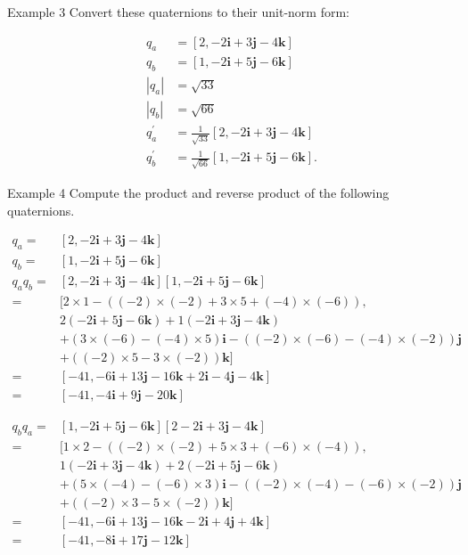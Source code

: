 Example 3 Convert these quaternions to their unit-norm form:

$$
\begin{aligned}
q_{a} & =[2,-2 \mathbf{i}+3 \mathbf{j}-4 \mathbf{k}] \\
q_{b} & =[1,-2 \mathbf{i}+5 \mathbf{j}-6 \mathbf{k}] \\
\left|q_{a}\right| & =\sqrt{33} \\
\left|q_{b}\right| & =\sqrt{66} \\
q_{a}^{\prime} & =\frac{1}{\sqrt{33}}[2,-2 \mathbf{i}+3 \mathbf{j}-4 \mathbf{k}] \\
q_{b}^{\prime} & =\frac{1}{\sqrt{66}}[1,-2 \mathbf{i}+5 \mathbf{j}-6 \mathbf{k}] .
\end{aligned}
$$

Example 4 Compute the product and reverse product of the following quaternions.

$$
\begin{aligned}
q_{a}= & {[2,-2 \mathbf{i}+3 \mathbf{j}-4 \mathbf{k}] } \\
q_{b}= & {[1,-2 \mathbf{i}+5 \mathbf{j}-6 \mathbf{k}] } \\
q_{a} q_{b}= & {[2,-2 \mathbf{i}+3 \mathbf{j}-4 \mathbf{k}][1,-2 \mathbf{i}+5 \mathbf{j}-6 \mathbf{k}] } \\
= & {[2 \times 1-((-2) \times(-2)+3 \times 5+(-4) \times(-6)),} \\
& 2(-2 \mathbf{i}+5 \mathbf{j}-6 \mathbf{k})+1(-2 \mathbf{i}+3 \mathbf{j}-4 \mathbf{k}) \\
& +(3 \times(-6)-(-4) \times 5) \mathbf{i}-((-2) \times(-6)-(-4) \times(-2)) \mathbf{j} \\
& +((-2) \times 5-3 \times(-2)) \mathbf{k}] \\
= & {[-41,-6 \mathbf{i}+13 \mathbf{j}-16 \mathbf{k}+2 \mathbf{i}-4 \mathbf{j}-4 \mathbf{k}] } \\
= & {[-41,-4 \mathbf{i}+9 \mathbf{j}-20 \mathbf{k}] }
\end{aligned}
$$

$$
\begin{aligned}
q_{b} q_{a}= & {[1,-2 \mathbf{i}+5 \mathbf{j}-6 \mathbf{k}][2-2 \mathbf{i}+3 \mathbf{j}-4 \mathbf{k}] } \\
= & {[1 \times 2-((-2) \times(-2)+5 \times 3+(-6) \times(-4)),} \\
& 1(-2 \mathbf{i}+3 \mathbf{j}-4 \mathbf{k})+2(-2 \mathbf{i}+5 \mathbf{j}-6 \mathbf{k}) \\
& +(5 \times(-4)-(-6) \times 3) \mathbf{i}-((-2) \times(-4)-(-6) \times(-2)) \mathbf{j} \\
& +((-2) \times 3-5 \times(-2)) \mathbf{k}] \\
= & {[-41,-6 \mathbf{i}+13 \mathbf{j}-16 \mathbf{k}-2 \mathbf{i}+4 \mathbf{j}+4 \mathbf{k}] } \\
= & {[-41,-8 \mathbf{i}+17 \mathbf{j}-12 \mathbf{k}] }
\end{aligned}
$$

